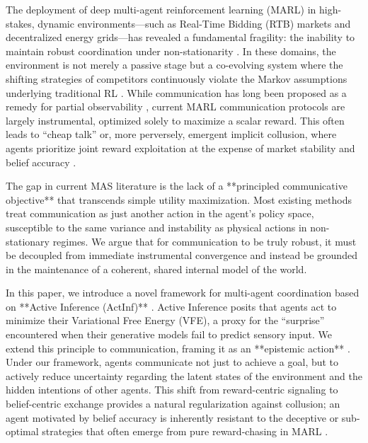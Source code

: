 The deployment of deep multi-agent reinforcement learning (MARL) in high-stakes, dynamic environments—such as Real-Time Bidding (RTB) markets and decentralized energy grids—has revealed a fundamental fragility: the inability to maintain robust coordination under non-stationarity \cite{papoudakis2021benchmarking, gronauer2022multi}. In these domains, the environment is not merely a passive stage but a co-evolving system where the shifting strategies of competitors continuously violate the Markov assumptions underlying traditional RL \cite{yuan2023multi}. While communication has long been proposed as a remedy for partial observability \cite{foerster2016learning, sukhbaatar2016learning}, current MARL communication protocols are largely instrumental, optimized solely to maximize a scalar reward. This often leads to ``cheap talk'' or, more perversely, emergent implicit collusion, where agents prioritize joint reward exploitation at the expense of market stability and belief accuracy \cite{hu2021multi, calvo2023survey}.

The gap in current MAS literature is the lack of a **principled communicative objective** that transcends simple utility maximization. Most existing methods treat communication as just another action in the agent's policy space, susceptible to the same variance and instability as physical actions in non-stationary regimes. We argue that for communication to be truly robust, it must be decoupled from immediate instrumental convergence and instead be grounded in the maintenance of a coherent, shared internal model of the world.

In this paper, we introduce a novel framework for multi-agent coordination based on **Active Inference (ActInf)** \cite{friston2010free, parrill2022active}. Active Inference posits that agents act to minimize their Variational Free Energy (VFE), a proxy for the ``surprise'' encountered when their generative models fail to predict sensory input. We extend this principle to communication, framing it as an **epistemic action** \cite{millidge2024sophisticated}. Under our framework, agents communicate not just to achieve a goal, but to actively reduce uncertainty regarding the latent states of the environment and the hidden intentions of other agents. This shift from reward-centric signaling to belief-centric exchange provides a natural regularization against collusion; an agent motivated by belief accuracy is inherently resistant to the deceptive or sub-optimal strategies that often emerge from pure reward-chasing in MARL \cite{smith2022active}.

